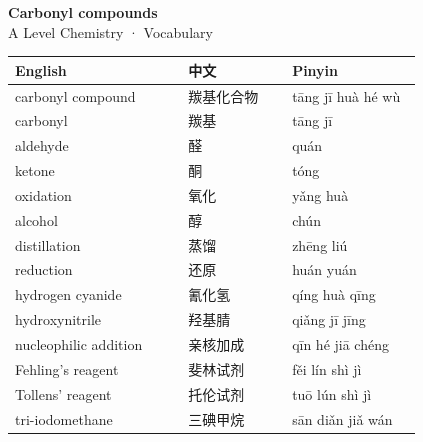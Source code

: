 \documentclass[11pt]{article}
\begin{document}
\begin{center}
  {\LARGE\bfseries Carbonyl compounds}\\[0.35em]
  {\large A Level Chemistry · Vocabulary}
\end{center}
\vspace{0.6em}

\begin{longtable}{@{}p{0.40\linewidth}p{0.24\linewidth}p{0.30\linewidth}@{}}
\toprule
\textbf{English} & \textbf{中文} & \textbf{Pinyin} \\
\midrule
\endhead
\bottomrule
\endlastfoot
carbonyl compound & 羰基化合物 & tāng jī huà hé wù \\
carbonyl & 羰基 & tāng jī \\
aldehyde & 醛 & quán \\
ketone & 酮 & tóng \\
oxidation & 氧化 & yǎng huà \\
alcohol & 醇 & chún \\
distillation & 蒸馏 & zhēng liú \\
reduction & 还原 & huán yuán \\
hydrogen cyanide & 氰化氢 & qíng huà qīng \\
hydroxynitrile & 羟基腈 & qiǎng jī jīng \\
nucleophilic addition & 亲核加成 & qīn hé jiā chéng \\
Fehling's reagent & 斐林试剂 & fěi lín shì jì \\
Tollens' reagent & 托伦试剂 & tuō lún shì jì \\
tri-iodomethane & 三碘甲烷 & sān diǎn jiǎ wán \\
\end{longtable}
\end{document}
